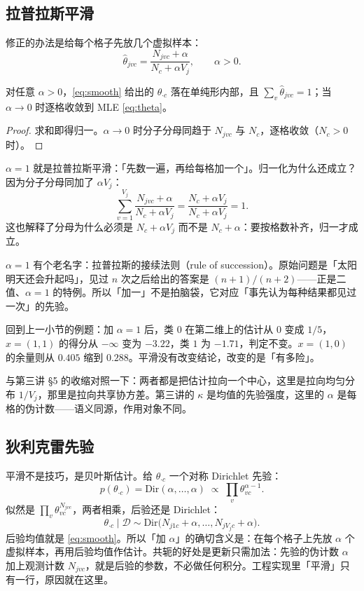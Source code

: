 \documentclass[11pt,a4paper,fontset=windows,zihao=-4]{ctexart}
\begin{document}
\subsection{拉普拉斯平滑}

修正的办法是给每个格子先放几个虚拟样本：
\begin{equation}
  \hat\theta_{jvc}=\frac{N_{jvc}+\alpha}{N_c+\alpha V_j},\qquad \alpha>0 .
  \label{eq:smooth}
\end{equation}
\begin{prop}[平滑估计的归一性]
对任意 $\alpha>0$，\eqref{eq:smooth} 给出的 $\hat\theta_{\cdot c}$ 落在单纯形内部，且 $\sum_v\hat\theta_{jvc}=1$；当 $\alpha\to0$ 时逐格收敛到 MLE \eqref{eq:theta}。
\end{prop}

\begin{proof}
求和即得归一。$\alpha\to0$ 时分子分母同趋于 $N_{jvc}$ 与 $N_c$，逐格收敛（$N_c>0$ 时）。
\end{proof}

$\alpha=1$ 就是拉普拉斯平滑：「先数一遍，再给每格加一个」。归一化为什么还成立？因为分子分母同加了 $\alpha V_j$：
\[
  \sum_{v=1}^{V_j}\frac{N_{jvc}+\alpha}{N_c+\alpha V_j}
  =\frac{N_c+\alpha V_j}{N_c+\alpha V_j}=1 .
\]
这也解释了分母为什么必须是 $N_c+\alpha V_j$ 而不是 $N_c+\alpha$：要按格数补齐，归一才成立。

$\alpha=1$ 有个老名字：拉普拉斯的接续法则（rule of succession）。原始问题是「太阳明天还会升起吗」，见过 $n$ 次之后给出的答案是 $(n+1)/(n+2)$——正是二值、$\alpha=1$ 的特例。所以「加一」不是拍脑袋，它对应「事先认为每种结果都见过一次」的先验。

回到上一小节的例题：加 $\alpha=1$ 后，类 $0$ 在第二维上的估计从 $0$ 变成 $1/5$，$x=(1,1)$ 的得分从 $-\infty$ 变为 $-3.22$，类 $1$ 为 $-1.71$，判定不变。$x=(1,0)$ 的余量则从 $0.405$ 缩到 $0.288$。平滑没有改变结论，改变的是「有多险」。

与第三讲 §5 的收缩对照一下：两者都是把估计拉向一个中心，这里是拉向均匀分布 $1/V_j$，那里是拉向共享协方差。第三讲的 $\kappa$ 是均值的先验强度，这里的 $\alpha$ 是每格的伪计数——语义同源，作用对象不同。

\subsection{狄利克雷先验}

平滑不是技巧，是贝叶斯估计。给 $\theta_{\cdot c}$ 一个对称 Dirichlet 先验：
\[
  p(\theta_{\cdot c})=\mathrm{Dir}(\alpha,\dots,\alpha)
  \;\propto\;\prod_{v}\theta_{vc}^{\alpha-1}.
\]
似然是 $\prod_v\theta_{vc}^{N_{jvc}}$，两者相乘，后验还是 Dirichlet：
\begin{equation}
  \theta_{\cdot c}\mid\mathcal D\sim\mathrm{Dir}\bigl(N_{j1c}+\alpha,\dots,N_{jV_jc}+\alpha\bigr).
  \label{eq:posterior}
\end{equation}
后验均值就是 \eqref{eq:smooth}。所以「加 $\alpha$」的确切含义是：在每个格子上先放 $\alpha$ 个虚拟样本，再用后验均值作估计。共轭的好处是更新只需加法：先验的伪计数 $\alpha$ 加上观测计数 $N_{jvc}$，就是后验的参数，不必做任何积分。工程实现里「平滑」只有一行，原因就在这里。
\end{document}
